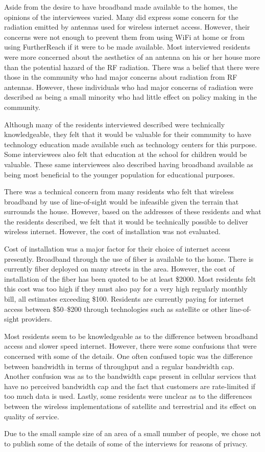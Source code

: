 Aside from the desire to have broadband made available to the homes, the opinions of the 
interviewees varied. Many did express some concern for the radiation emitted by antennas
used for wireless internet access. However, their concerns were not enough to prevent them
from using WiFi at home or from using FurtherReach if it were to be made available.
Most interviewed residents were more concerned about the aesthetics of an antenna on his or her
house more than the potential hazard of the RF radiation.
There was a belief that there were those in the community who had major concerns about radiation
from RF antennas. However, these individuals who had major concerns of radiation were described
as being a small minority who had little effect on policy making in the community.

Although many of the residents interviewed described were technically knowledgeable, they felt
that it would be valuable for their community to have technology education made available such
as technology centers for this purpose. Some interviewees also felt that education at the school
for children would be valuable. These same interviewees also described having broadband available
as being most beneficial to the younger population for educational purposes.

There was a technical concern from many residents who felt that wireless broadband by use of
line-of-sight would be infeasible given the terrain that surrounds the house. However, based
on the addresses of these residents and what the residents described, we felt
that it would be technically possible to deliver wireless internet. However, the cost of
installation was not evaluated.

Cost of installation was a major factor for their choice of internet access presently. Broadband
through the use of fiber is available to the home. There is currently fiber deployed on many
streets in the area. However, the cost of installation of the fiber has been quoted to be at least \$2000.
Most residents felt this cost was too high if they must also pay for a very high regularly monthly bill, all
estimates exceeding \$100. Residents are currently paying for internet access between \$50--\$200
through technologies such as satellite or other line-of-sight providers.

Most residents seem to be knowledgeable as to the difference between broadband access and slower speed internet.
However, there were some confusions that were concerned with some of the details. One often confused topic was
the difference between bandwidth in terms of throughput and a regular bandwidth cap. Another confusion was
as to the bandwidth caps present in cellular services that have no perceived bandwidth cap and the fact that
customers are rate-limited if too much data is used. Lastly, some residents were unclear as to the differences
between the wireless implementations of satellite and terrestrial and its effect on quality of service.

Due to the small sample size of an area of a small number of people,
we chose not to publish some of the details of some of the
interviews for reasons of privacy.


